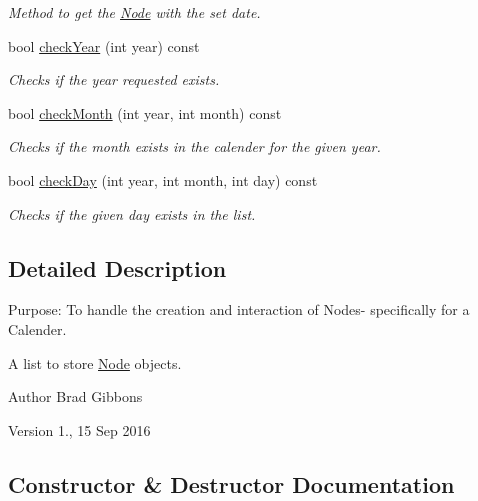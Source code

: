 \begin{DoxyCompactItemize}
\begin{DoxyCompactList}\small\item\em Method to get the \hyperlink{class_node}{Node} with the set date. \end{DoxyCompactList}\item 
bool \hyperlink{class_double_linked_list_a9d07d8d5b62ee69959b76667e83642ac}{check\+Year} (int year) const
\begin{DoxyCompactList}\small\item\em Checks if the year requested exists. \end{DoxyCompactList}\item 
bool \hyperlink{class_double_linked_list_a5b15624d2284b0bd9bcb5e137242da77}{check\+Month} (int year, int month) const
\begin{DoxyCompactList}\small\item\em Checks if the month exists in the calender for the given year. \end{DoxyCompactList}\item 
bool \hyperlink{class_double_linked_list_a30a4acb8c596efd5dfa89aee133f58b2}{check\+Day} (int year, int month, int day) const
\begin{DoxyCompactList}\small\item\em Checks if the given day exists in the list. \end{DoxyCompactList}\end{DoxyCompactItemize}


\subsection{Detailed Description}
Purpose\+: To handle the creation and interaction of Nodes-\/ specifically for a Calender. 

A list to store \hyperlink{class_node}{Node} objects. \begin{DoxyAuthor}{Author}
Brad Gibbons 
\end{DoxyAuthor}
\begin{DoxyVersion}{Version}
1., 15 Sep 2016 
\end{DoxyVersion}


\subsection{Constructor \& Destructor Documentation}
\hypertarget{class_double_linked_list_a7e2c72978120a51da2251e378ef1892c}{}\label{class_double_linked_list_a7e2c72978120a51da2251e378ef1892c} 

